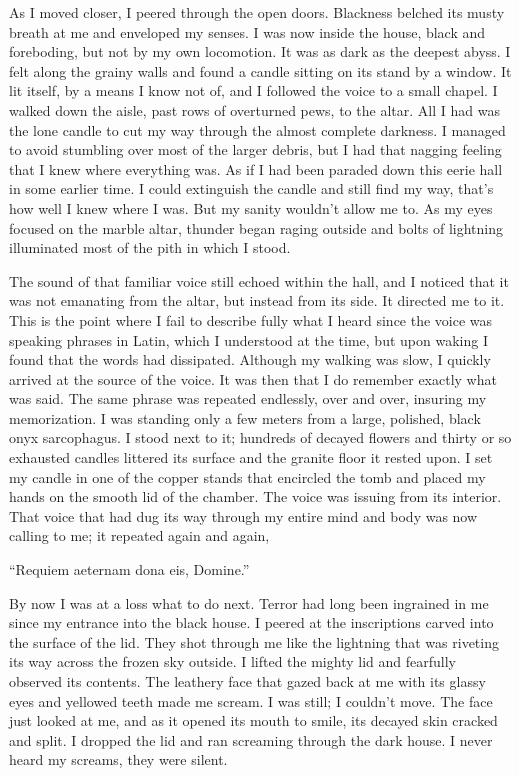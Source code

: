 \documentclass[
]{article}
\begin{document}
As I moved closer, I peered through the open doors. Blackness belched
its musty breath at me and enveloped my senses. I was now inside the
house, black and foreboding, but not by my own locomotion. It was as
dark as the deepest abyss. I felt along the grainy walls and found a
candle sitting on its stand by a window. It lit itself, by a means I
know not of, and I followed the voice to a small chapel. I walked down
the aisle, past rows of overturned pews, to the altar. All I had was the
lone candle to cut my way through the almost complete darkness. I
managed to avoid stumbling over most of the larger debris, but I had
that nagging feeling that I knew where everything was. As if I had been
paraded down this eerie hall in some earlier time. I could extinguish
the candle and still find my way, that's how well I knew where I was.
But my sanity wouldn't allow me to. As my eyes focused on the marble
altar, thunder began raging outside and bolts of lightning illuminated
most of the pith in which I stood.

The sound of that familiar voice still echoed within the hall, and I
noticed that it was not emanating from the altar, but instead from its
side. It directed me to it. This is the point where I fail to describe
fully what I heard since the voice was speaking phrases in Latin, which
I understood at the time, but upon waking I found that the words had
dissipated. Although my walking was slow, I quickly arrived at the
source of the voice. It was then that I do remember exactly what was
said. The same phrase was repeated endlessly, over and over, insuring my
memorization. I was standing only a few meters from a large, polished,
black onyx sarcophagus. I stood next to it; hundreds of decayed flowers
and thirty or so exhausted candles littered its surface and the granite
floor it rested upon. I set my candle in one of the copper stands that
encircled the tomb and placed my hands on the smooth lid of the chamber.
The voice was issuing from its interior. That voice that had dug its way
through my entire mind and body was now calling to me; it repeated again
and again,

``Requiem aeternam dona eis, Domine.''

By now I was at a loss what to do next. Terror had long been ingrained
in me since my entrance into the black house. I peered at the
inscriptions carved into the surface of the lid. They shot through me
like the lightning that was riveting its way across the frozen sky
outside. I lifted the mighty lid and fearfully observed its contents.
The leathery face that gazed back at me with its glassy eyes and
yellowed teeth made me scream. I was still; I couldn't move. The face
just looked at me, and as it opened its mouth to smile, its decayed skin
cracked and split. I dropped the lid and ran screaming through the dark
house. I never heard my screams, they were silent.
\end{document}
